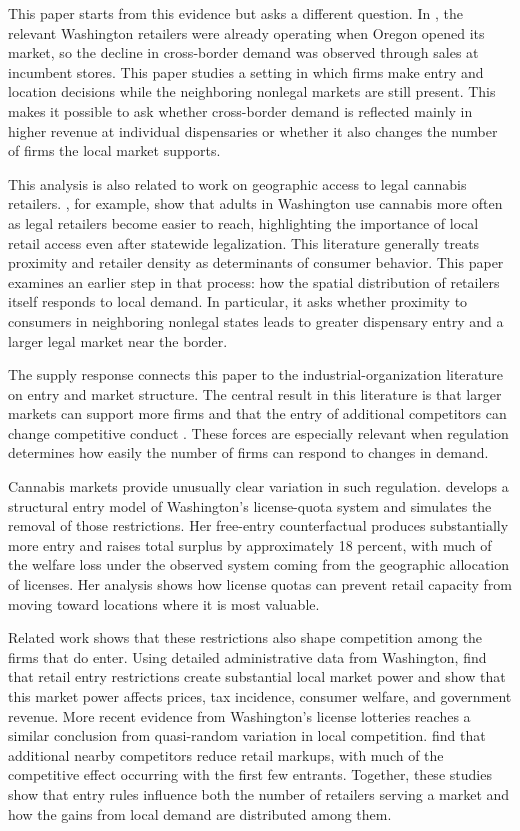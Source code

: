 \documentclass[12pt]{article}
\begin{document}
This paper starts from this evidence but asks a different question. In \cite{HansenMillerWeber2020}, the relevant Washington retailers were already operating when Oregon opened its market, so the decline in cross-border demand was observed through sales at incumbent stores. This paper studies a setting in which firms make entry and location decisions while the neighboring nonlegal markets are still present. This makes it possible to ask whether cross-border demand is reflected mainly in higher revenue at individual dispensaries or whether it also changes the number of firms the local market supports.

This analysis is also related to work on geographic access to legal cannabis retailers. \cite{AmbroseCowanRosenman2021}, for example, show that adults in Washington use cannabis more often as legal retailers become easier to reach, highlighting the importance of local retail access even after statewide legalization. This literature generally treats proximity and retailer density as determinants of consumer behavior. This paper examines an earlier step in that process: how the spatial distribution of retailers itself responds to local demand. In particular, it asks whether proximity to consumers in neighboring nonlegal states leads to greater dispensary entry and a larger legal market near the border.

The supply response connects this paper to the industrial-organization literature on entry and market structure. The central result in this literature is that larger markets can support more firms and that the entry of additional competitors can change competitive conduct \cite{BresnahanReiss1991, BerryReiss2007}. These forces are especially relevant when regulation determines how easily the number of firms can respond to changes in demand.

Cannabis markets provide unusually clear variation in such regulation. \cite{thomas2019license} develops a structural entry model of Washington's license-quota system and simulates the removal of those restrictions. Her free-entry counterfactual produces substantially more entry and raises total surplus by approximately 18 percent, with much of the welfare loss under the observed system coming from the geographic allocation of licenses. Her analysis shows how license quotas can prevent retail capacity from moving toward locations where it is most valuable.

Related work shows that these restrictions also shape competition among the firms that do enter. Using detailed administrative data from Washington, \cite{HollenbeckUetake2021} find that retail entry restrictions create substantial local market power and show that this market power affects prices, tax incidence, consumer welfare, and government revenue. More recent evidence from Washington's license lotteries reaches a similar conclusion from quasi-random variation in local competition. \cite{HollenbeckHristakevaUetake2026} find that additional nearby competitors reduce retail markups, with much of the competitive effect occurring with the first few entrants. Together, these studies show that entry rules influence both the number of retailers serving a market and how the gains from local demand are distributed among them.
\end{document}
